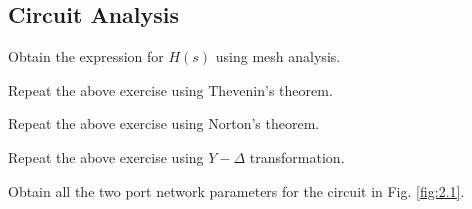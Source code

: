 \subsection{Circuit Analysis}
%
\begin{problem}
	Obtain the expression for $H(s)$ using mesh analysis.
\end{problem}
%
\begin{problem}
	Repeat the above exercise using Thevenin's theorem.
	\end{problem}
	\begin{problem}
		Repeat the above exercise using Norton's theorem.
		\end{problem}
	\begin{problem}
		Repeat the above exercise using $Y-\Delta$ transformation.
	\end{problem}
\begin{problem}
	Obtain all the two port network parameters for the circuit in Fig. \ref{fig:2.1}.
\end{problem}
%			

%
